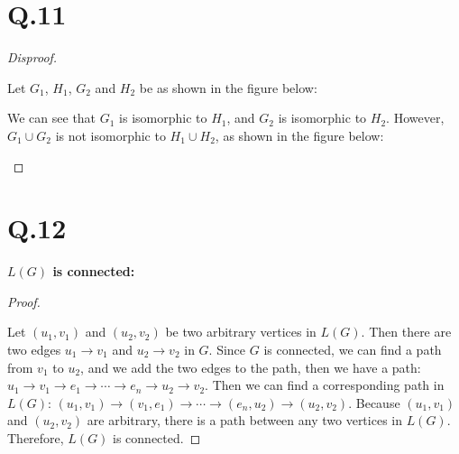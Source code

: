 \documentclass[a4paper,12pt]{article}
\begin{document}
\section*{Q.11}

\begin{proof}[Disproof]
$ $

Let $G_1$, $H_1$, $G_2$ and $H_2$ be as shown in the figure below:
\begin{center}
\end{center}

We can see that $G_1$ is isomorphic to $H_1$, and $G_2$ is isomorphic to $H_2$.
However, $G_1 \cup G_2$ is not isomorphic to $H_1 \cup H_2$, as shown in the figure below:
\begin{center}
\end{center}

\end{proof}

\section*{Q.12}

\textbf{$L(G)$ is connected:}

\begin{proof}
$ $

Let $(u_1, v_1)$ and $(u_2, v_2)$ be two arbitrary vertices in $L(G)$.
Then there are two edges $u_1 \rightarrow v_1$ and $u_2 \rightarrow v_2$ in $G$.
Since $G$ is connected, we can find a path from $v_1$ to $u_2$, and we add the two edges to the path, then we have a path: $u_1 \rightarrow v_1 \rightarrow e_1 \rightarrow \cdots \rightarrow e_n \rightarrow u_2 \rightarrow v_2$.
Then we can find a corresponding path in $L(G)$: $(u_1, v_1) \rightarrow (v_1, e_1) \rightarrow \cdots \rightarrow (e_n, u_2) \rightarrow (u_2, v_2)$.
Because $(u_1, v_1)$ and $(u_2, v_2)$ are arbitrary, there is a path between any two vertices in $L(G)$.
Therefore, $L(G)$ is connected.
\end{proof}
\end{document}
